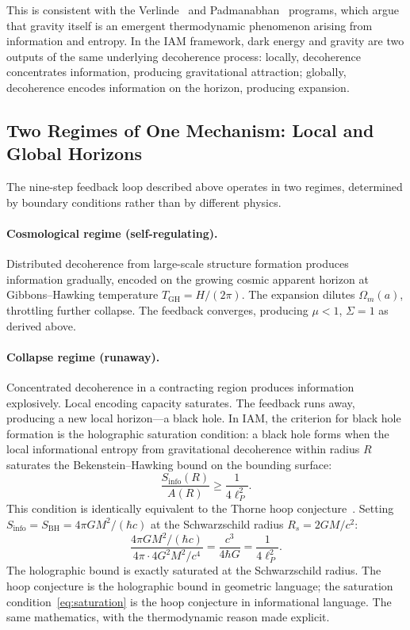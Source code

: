 \documentclass[11pt]{article}
\begin{document}
This is consistent with the Verlinde~\citep{Verlinde2011} and
Padmanabhan~\citep{Padmanabhan2010} programs, which argue that gravity
itself is an emergent thermodynamic phenomenon arising from information and
entropy.  In the IAM framework, dark energy and gravity are two outputs of
the same underlying decoherence process: locally, decoherence concentrates
information, producing gravitational attraction; globally, decoherence
encodes information on the horizon, producing expansion.

\subsection{Two Regimes of One Mechanism: Local and Global Horizons}
\label{sec:two_regimes}

The nine-step feedback loop described above operates in two regimes,
determined by boundary conditions rather than by different physics.

\paragraph{Cosmological regime (self-regulating).}
Distributed decoherence from large-scale structure formation produces
information gradually, encoded on the growing cosmic apparent horizon at
Gibbons--Hawking temperature $T_\mathrm{GH} = H/(2\pi)$.  The expansion
dilutes $\Omega_m(a)$, throttling further collapse.  The feedback
converges, producing $\mu < 1$, $\Sigma = 1$ as derived above.

\paragraph{Collapse regime (runaway).}
Concentrated decoherence in a contracting region produces information
explosively.  Local encoding capacity saturates.  The feedback runs
away, producing a new local horizon---a black hole.  In IAM, the
criterion for black hole formation is the holographic saturation
condition: a black hole forms when the local informational entropy
from gravitational decoherence within radius $R$ saturates the
Bekenstein--Hawking bound on the bounding surface:
\begin{equation}
\frac{S_\mathrm{info}(R)}{A(R)} \geq \frac{1}{4\ell_P^2}.
\label{eq:saturation}
\end{equation}
This condition is identically equivalent to the Thorne hoop
conjecture~\citep{Thorne1972}.  Setting $S_\mathrm{info} = S_\mathrm{BH}
= 4\pi GM^2/(\hbar c)$ at the Schwarzschild radius
$R_s = 2GM/c^2$:
\begin{equation}
\frac{4\pi GM^2/(\hbar c)}{4\pi \cdot 4G^2M^2/c^4}
= \frac{c^3}{4\hbar G}
= \frac{1}{4\ell_P^2}.
\end{equation}
The holographic bound is exactly saturated at the Schwarzschild radius.
The hoop conjecture is the holographic bound in geometric language; the
saturation condition~\eqref{eq:saturation} is the hoop conjecture in
informational language.  The same mathematics, with the thermodynamic
reason made explicit.
\end{document}
